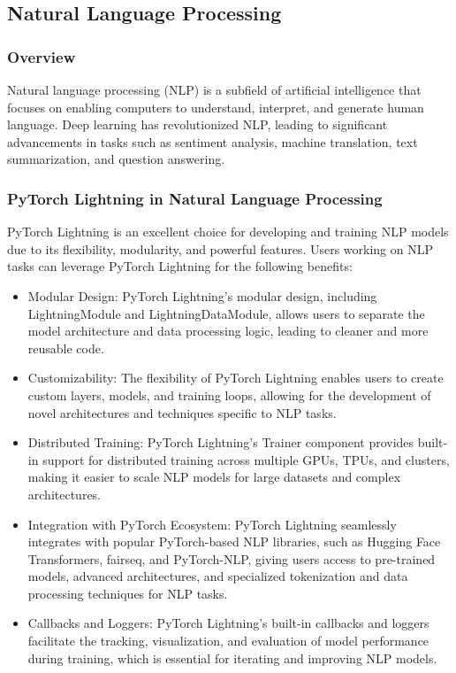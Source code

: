 \documentclass[12pt]{article}
\begin{document}
\subsection{Natural Language Processing}

\subsubsection{Overview}

Natural language processing (NLP) is a subfield of artificial intelligence that focuses on enabling computers to understand, interpret, and generate human language. Deep learning has revolutionized NLP, leading to significant advancements in tasks such as sentiment analysis, machine translation, text summarization, and question answering.

\subsubsection{PyTorch Lightning in Natural Language Processing}

PyTorch Lightning is an excellent choice for developing and training NLP models due to its flexibility, modularity, and powerful features. Users working on NLP tasks can leverage PyTorch Lightning for the following benefits:

\begin{itemize}
    \item Modular Design: PyTorch Lightning's modular design, including LightningModule and LightningDataModule, allows users to separate the model architecture and data processing logic, leading to cleaner and more reusable code.
    \item Customizability: The flexibility of PyTorch Lightning enables users to create custom layers, models, and training loops, allowing for the development of novel architectures and techniques specific to NLP tasks.
    \item Distributed Training: PyTorch Lightning's Trainer component provides built-in support for distributed training across multiple GPUs, TPUs, and clusters, making it easier to scale NLP models for large datasets and complex architectures.
    \item Integration with PyTorch Ecosystem: PyTorch Lightning seamlessly integrates with popular PyTorch-based NLP libraries, such as Hugging Face Transformers, fairseq, and PyTorch-NLP, giving users access to pre-trained models, advanced architectures, and specialized tokenization and data processing techniques for NLP tasks.
    \item Callbacks and Loggers: PyTorch Lightning's built-in callbacks and loggers facilitate the tracking, visualization, and evaluation of model performance during training, which is essential for iterating and improving NLP models.
\end{itemize}
\end{document}
